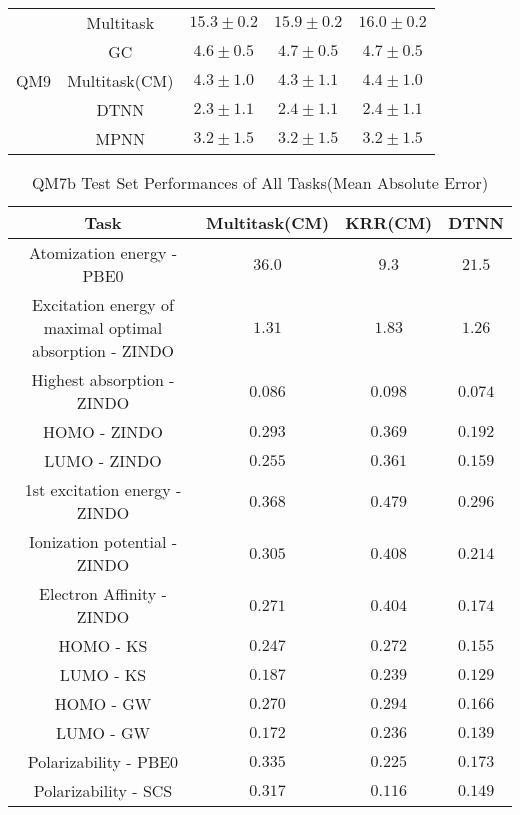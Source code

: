 \begin{table}[H]
\begin{tabular}{ |c|c|c|c|c| }
    \hline
    \hline    
    \multirow{5}{*}{QM9}
    & Multitask & $15.3\pm0.2$ & $15.9\pm0.2$ & $16.0\pm0.2$ \\\cline{2-5}
    & GC & $4.6\pm0.5$ & $4.7\pm0.5$ & $4.7\pm0.5$ \\\cline{2-5}
    & Multitask(CM) & $4.3\pm1.0$ & $4.3\pm1.1$ & $4.4\pm1.0$ \\\cline{2-5}
    & DTNN & $2.3\pm1.1$ & $\mathbf{2.4\pm1.1}$ & $\mathbf{2.4\pm1.1}$ \\\cline{2-5}
    & MPNN & $3.2\pm1.5$ & $3.2\pm1.5$ & $3.2\pm1.5$ \\\cline{2-5}
    \hline
    \end{tabular}
    \label{tab:QM7_QM7b_QM8_QM9}
\end{table}

\begin{table}[H]
    \small
    \centering
    \caption{QM7b Test Set Performances of All Tasks(Mean Absolute Error)}
    \begin{tabular}{ |c|c|c|c| } 
    \hline
    \textbf{Task} & Multitask(CM) & KRR(CM) & DTNN \\
    \hline
    \hline    
    Atomization energy - PBE0 & $36.0$ & $\mathbf{9.3}$ & $21.5$\\
    \hline    
    Excitation energy of maximal optimal absorption - ZINDO & $1.31$ & $1.83$ & $\mathbf{1.26}$\\
    \hline    
    Highest absorption - ZINDO & $0.086$ & $0.098$ & $\mathbf{0.074}$\\
    \hline
    HOMO - ZINDO & $0.293$ & $0.369$ & $\mathbf{0.192}$\\
    \hline
    LUMO - ZINDO & $0.255$ & $0.361$ & $\mathbf{0.159}$\\
    \hline
    1st excitation energy - ZINDO & $0.368$ & $0.479$ & $\mathbf{0.296}$\\
    \hline
    Ionization potential - ZINDO & $0.305$ & $0.408$ & $\mathbf{0.214}$\\
    \hline
    Electron Affinity - ZINDO & $0.271$ & $0.404$ & $\mathbf{0.174}$\\
    \hline
    HOMO - KS & $0.247$ & $0.272$ & $\mathbf{0.155}$\\
    \hline
    LUMO - KS & $0.187$ & $0.239$ & $\mathbf{0.129}$\\
    \hline
    HOMO - GW & $0.270$ & $0.294$ & $\mathbf{0.166}$\\
    \hline
    LUMO - GW & $0.172$ & $0.236$ & $\mathbf{0.139}$\\
    \hline
    Polarizability - PBE0 & $0.335$ & $0.225$ & $\mathbf{0.173}$\\
    \hline
    Polarizability - SCS & $0.317$ & $\mathbf{0.116}$ & $0.149$\\
    \hline
    \end{tabular}
    \label{tab:QM7b}
\end{table}

